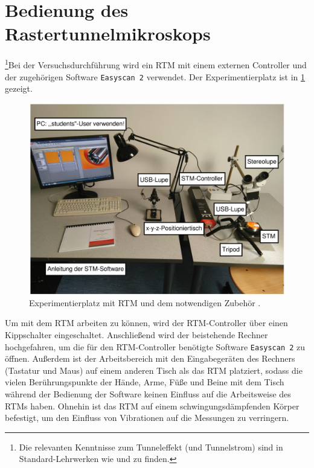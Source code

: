 \section{Bedienung des Rastertunnelmikroskops}\label{sec:versuch}
\footnote[1]{Die relevanten Kenntnisse zum Tunneleffekt (und Tunnelstrom) sind in Standard-Lehrwerken wie \cite{Demtröder:829119} und \cite{münster} zu finden.}Bei der Versuchsdurchführung wird ein RTM mit einem externen Controller und der zugehörigen Software \texttt{Easyscan 2} verwendet.
Der Experimentierplatz ist in \cref{fig:versuchsplatz} gezeigt.
\begin{figure}[H]
	\centering
	\includegraphics[width=0.8\linewidth]{../figs/versuchsplatz.png}
	\caption{Experimentierplatz mit RTM und dem notwendigen Zubehör \cite{skript}.}
	\label{fig:versuchsplatz}
\end{figure}
Um mit dem RTM arbeiten zu können, wird der RTM-Controller über einen Kippschalter eingeschaltet. Anschließend wird der beistehende Rechner
hochgefahren, um die für den RTM-Controller benötigte Software \texttt{Easyscan 2} zu öffnen. Außerdem ist der Arbeitsbereich mit den Eingabegeräten
des Rechners (Tastatur und Maus) auf einem anderen Tisch als das RTM platziert, sodass die vielen Berührungspunkte der Hände, Arme, Füße und Beine mit dem Tisch während der Bedienung
der Software keinen Einfluss auf die Arbeitsweise des RTMs haben. Ohnehin ist das RTM auf einem schwingungsdämpfenden Körper befestigt, um
den Einfluss von Vibrationen auf die Messungen zu verringern. %
\par
